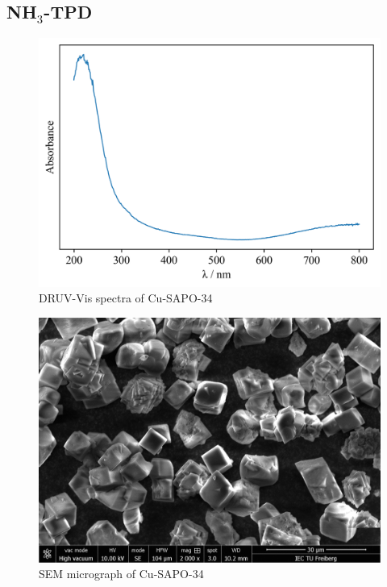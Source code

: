 \documentclass[preprint,12pt]{elsarticle}
\newcommand{\ammonia}{NH$_3$}
\begin{document}
\subsection{\ammonia-TPD}



\begin{figure}
    \centering
    \includegraphics[width=0.95\linewidth]{Figures/Cu_SAPO_34_absorbance.png}
    \caption{DRUV-Vis spectra of Cu-SAPO-34}
    \label{fig:DRUV-Vis Cu-SAPO-34}
\end{figure}


\begin{figure}
    \centering
    \includegraphics[width=0.95\linewidth]{Figures/SEM-Cu-SAPO-34.png}
    \caption{SEM micrograph of Cu-SAPO-34}
    \label{fig:SEM Cu-SAPO-34}
\end{figure}
\end{document}
